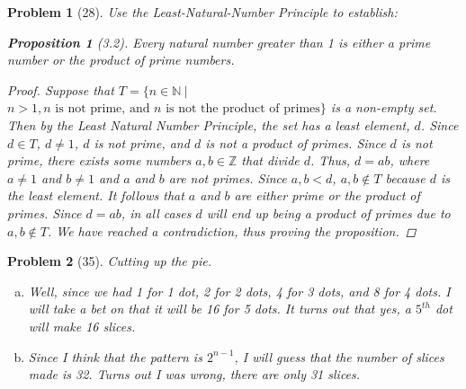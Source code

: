 \documentclass{article}
\theoremstyle{problem}
\newtheorem{prob}{Problem}
\theoremstyle{plain}
\newtheorem{prop}{Proposition}
\begin{document}
  \begin{prob}[28]
    Use the Least-Natural-Number Principle to establish:
    \begin{prop}[3.2]
      Every natural number greater than 1 is either a prime number or the product of prime numbers.
    \end{prop}
    \begin{proof}
      Suppose that $T = \{n \in \mathbb{N}\ |$ $n > 1, n \text{ is not prime, and } n \text{ is not the product of primes}\}$ is a non-empty set. Then by the Least Natural Number Principle, the set has a least element, $d$. Since $d \in T$, $d \not = 1$, $d$ is not prime, and $d$ is not a product of primes. Since $d$ is not prime, there exists some numbers $a,b \in \mathbb{Z}$ that divide $d$. Thus, $d = ab$, where $a \not = 1$ and $b \not = 1$ and $a$ and $b$ are not primes. Since $a,b < d$, $a,b \not \in T$ because $d$ is the least element. It follows that $a$ and $b$ are either prime or the product of primes. Since $d = ab$, in all cases $d$ will end up being a product of primes due to $a,b \not \in T$. We have reached a contradiction, thus proving the proposition.

    \end{proof}
  \end{prob}
  \begin{prob}[35] Cutting up the pie.
    \begin{enumerate}[a)]
      \item Well, since we had 1 for 1 dot, 2 for 2 dots, 4 for 3 dots, and 8 for 4 dots. I will take a bet on that it will be 16 for 5 dots. It turns out that yes, a $5^{th}$ dot will make 16 slices.
      \item Since I think that the pattern is $2^{n-1}$, I will guess that the number of slices made is 32. Turns out I was wrong, there are only 31 slices.
      \end{enumerate}  
    \end{prob}
\end{document}
